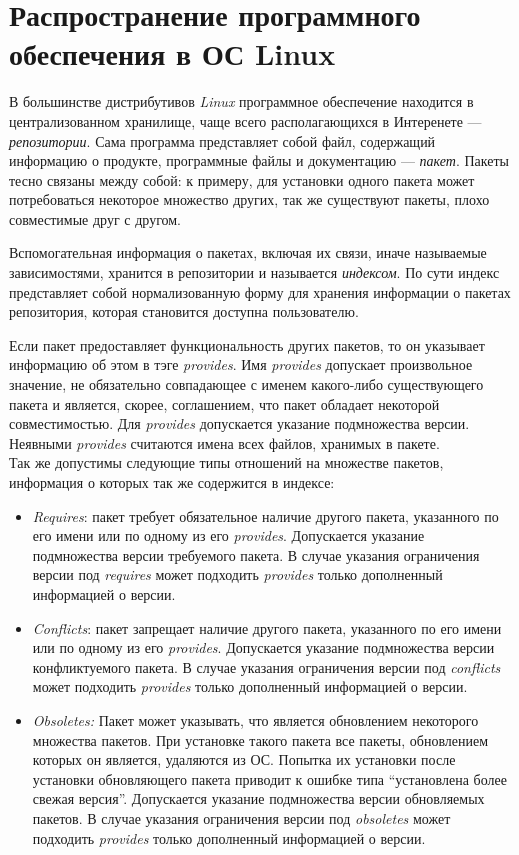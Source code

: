 \section{Распространение программного обеспечения в ОС Linux}

В большинстве дистрибутивов \textit{Linux} программное обеспечение находится
в централизованном хранилище, чаще всего располагающихся в Интеренете 
--- \textit{репозитории}. Сама программа представляет собой файл, содержащий
информацию о продукте, программные файлы и документацию --- \textit{пакет}. 
Пакеты тесно связаны между собой: к примеру, для установки одного пакета
может потребоваться некоторое множество других, так же существуют пакеты, плохо
совместимые друг с другом. 

Вспомогательная информация о пакетах, включая их связи, иначе называемые зависимостями,
хранится в репозитории и называется \textit{индексом}.
По сути индекс представляет собой нормализованную форму для хранения информации о пакетах 
репозитория, которая становится доступна пользователю.

Если пакет предоставляет 
функциональность других пакетов, то он указывает информацию об этом в тэге \textit{provides}.
Имя \textit{provides} допускает произвольное значение, не обязательно совпадающее с
именем какого-либо существующего  пакета и является, скорее, соглашением, что пакет
обладает некоторой совместимостью. Для \textit{provides} допускается указание подмножества 
версии. Неявными \textit{provides} считаются имена всех файлов, хранимых в пакете.\\

Так же допустимы следующие типы отношений на множестве пакетов, информация о которых так
же содержится в индексе:
\begin{itemize}
\item{\textit{Requires}: пакет требует обязательное наличие другого пакета, указанного
по его имени или по одному из его \textit{provides}. Допускается указание 
подмножества версии требуемого пакета. В случае указания ограничения версии
под \textit{requires} может подходить \textit{provides} только дополненный информацией
о версии.}
\item{\textit{Conflicts}: пакет запрещает наличие другого пакета, указанного по его имени
 или по одному из его \textit{provides}. Допускается указание подмножества
версии конфликтуемого пакета. В случае указания ограничения версии
под \textit{conflicts} может подходить \textit{provides} только дополненный информацией
о версии.}
\item{\textit{Obsoletes:} Пакет может указывать, что является обновлением некоторого
множества пакетов. При установке такого пакета все пакеты, обновлением
которых он является, удаляются из ОС. Попытка их установки после
установки обновляющего пакета приводит к ошибке типа ``установлена
более свежая версия''. Допускается указание подмножества версии обновляемых
пакетов. В случае указания ограничения версии под \textit{obsoletes} может
подходить \textit{provides} только дополненный информацией о версии.}
\end{itemize}

